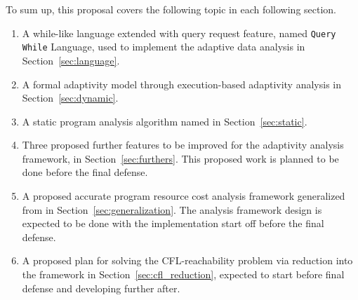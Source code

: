 To sum up, this proposal covers the following topic in each following section.
\begin{enumerate}
\item A while-like language extended with query request feature, named {\tt Query While} Language, 
used to implement 
the adaptive data analysis in Section~\ref{sec:language}.
\item A formal adaptivity model through execution-based adaptivity analysis in Section~\ref{sec:dynamic}.
\item A static program analysis algorithm named {\THESYSTEM} in Section~\ref{sec:static}.
\item Three proposed further features to be improved for the adaptivity analysis framework,
in Section~\ref{sec:furthers}.
 This proposed work is planned to be done before the final defense.
\item A proposed accurate program resource cost analysis framework generalized from {\THESYSTEM} in Section~\ref{sec:generalization}. 
The analysis framework design is expected to be done with the implementation start off before the final defense.
\item A proposed plan for solving the CFL-reachability problem via reduction into the {\THESYSTEM} framework in Section~\ref{sec:cfl_reduction},
expected to start before final defense and developing further after.
\end{enumerate}